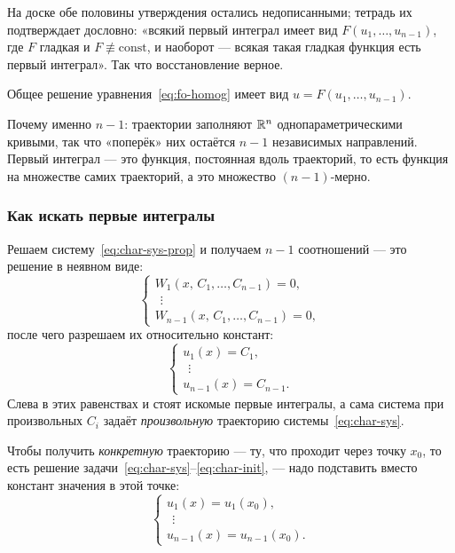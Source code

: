 \begin{warn}
На доске обе половины утверждения остались недописанными; тетрадь их
подтверждает дословно: «всякий первый интеграл имеет вид
$F(u_1,\dots,u_{n-1})$, где $F$ гладкая и $F \not\equiv \mathrm{const}$, и
наоборот — всякая такая гладкая функция есть первый интеграл». Так что
восстановление верное.
\end{warn}

\begin{corollary*}
Общее решение уравнения~\eqref{eq:fo-homog} имеет вид
$u = F(u_1,\dots,u_{n-1})$.
\end{corollary*}

\begin{idea}
Почему именно $n-1$: траектории заполняют $\mathbb{R}^n$ однопараметрическими кривыми,
так что «поперёк» них остаётся $n-1$ независимых направлений. Первый интеграл —
это функция, постоянная вдоль траекторий, то есть функция на множестве самих
траекторий, а это множество $(n-1)$-мерно.
\end{idea}

\subsubsection*{Как искать первые интегралы}

Решаем систему~\eqref{eq:char-sys-prop} и получаем $n-1$ соотношений — это
решение в неявном виде:
\[
  \begin{cases}
    W_1(x,\, C_1,\dots,C_{n-1}) = 0, \\
    \ \ \vdots \\
    W_{n-1}(x,\, C_1,\dots,C_{n-1}) = 0,
  \end{cases}
\]
после чего разрешаем их относительно констант:
\[
  \begin{cases}
    u_1(x) = C_1, \\
    \ \ \vdots \\
    u_{n-1}(x) = C_{n-1} .
  \end{cases}
\]
Слева в этих равенствах и стоят искомые первые интегралы, а сама система при
произвольных $C_i$ задаёт \emph{произвольную} траекторию
системы~\eqref{eq:char-sys}.

\medskip
Чтобы получить \emph{конкретную} траекторию — ту, что проходит через точку
$x_0$, то есть решение задачи~\eqref{eq:char-sys}--\eqref{eq:char-init}, —
надо подставить вместо констант значения в этой точке:
\[
  \begin{cases}
    u_1(x) = u_1(x_0), \\
    \ \ \vdots \\
    u_{n-1}(x) = u_{n-1}(x_0) .
  \end{cases}
\]

